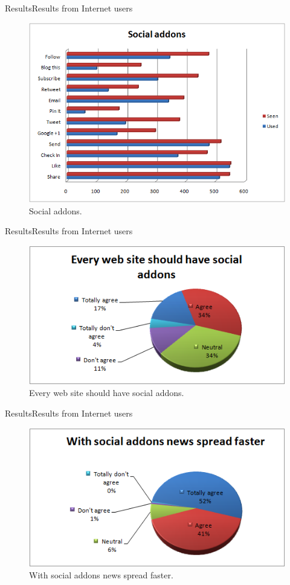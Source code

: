 \begin{frame}{Results}{Results from Internet users}
      \begin{figure}
    \centering
        \includegraphics[width=.7\textwidth]{images/viral/social_addons}
        \caption{Social addons.}
        \label{fig:social_addons}
    \end{figure}
\end{frame}

\begin{frame}{Results}{Results from Internet users}
      \begin{figure}
    \centering
        \includegraphics[width=.8\textwidth]{images/viral/every_web_site}
        \caption{Every web site should have social addons.}
        \label{fig:social_addons}
    \end{figure}
\end{frame}

\begin{frame}{Results}{Results from Internet users}
      \begin{figure}
    \centering
        \includegraphics[width=.8\textwidth]{images/viral/news_spread_faster}
        \caption{With social addons news spread faster.}
        \label{fig:news_spread_faster}
    \end{figure}
\end{frame}

